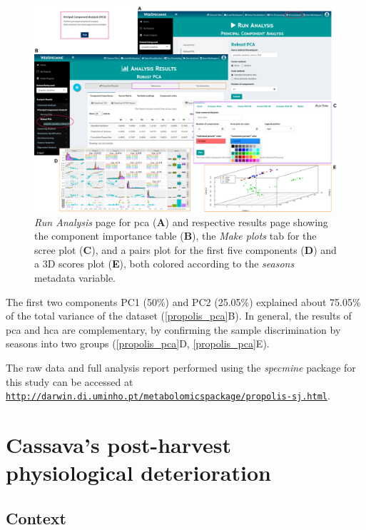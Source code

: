 \begin{figure}[H]
	\centering
	\includegraphics[width=1\linewidth]{Imagens/Propolis/pca}
	\caption{\textit{Run Analysis} page for \gls{pca} (\textbf{A}) and respective results page showing the component importance table (\textbf{B}), the \textit{Make plots} tab for the scree plot (\textbf{C}), and a pairs plot for the first five components (\textbf{D}) and a 3D scores plot (\textbf{E}), both colored according to the \textit{seasons} metadata variable.}
	\label{propolis_pca}
\end{figure}


The first two components PC1 (50\%) and PC2 (25.05\%) explained about 75.05\% of the total variance of the dataset (\autoref{propolis_pca}B). In general, the results of \gls{pca} and \gls{hca} are complementary, by confirming the sample discrimination by seasons into two groups (\autoref{propolis_pca}D, \autoref{propolis_pca}E). 

The raw data and full analysis report performed using the \textit{specmine} package for this study can be accessed at \href{http://darwin.di.uminho.pt/metabolomicspackage/propolis-sj.html}{\nolinkurl{http://darwin.di.uminho.pt/metabolomicspackage/propolis-sj.html}}.




\section{Cassava's post-harvest physiological deterioration}

\subsection{Context}

